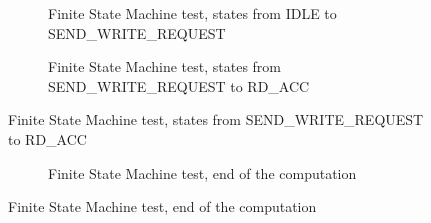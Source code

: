 \begin{figure}
\begin{figure}[H]
	\begin{center}
	\end{center}
	\caption{Finite State Machine test, states from IDLE to SEND\_WRITE\_REQUEST}

	\label{fig:fsm_test_1}
\end{figure}

\begin{figure}[H]
	\begin{center}
	\end{center}
	\caption{Finite State Machine test, states from SEND\_WRITE\_REQUEST to RD\_ACC}

	\label{fig:fsm_test_2}
\end{figure}

\end{figure}

\newpage

\begin{figure}

\begin{figure}[H]
	\begin{center}
	\end{center}
	\caption{Finite State Machine test, end of the computation}

	\label{fig:fsm_test_3}
\end{figure}

\end{figure}
\newpage

